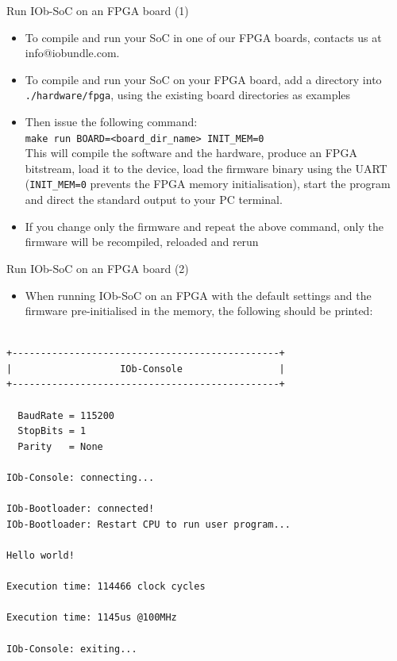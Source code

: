 \documentclass [xcolor=svgnames, t] {beamer}
\begin{document}
\begin{frame}{Run IOb-SoC on an FPGA board (1)}
\begin{itemize}
\item To compile and run your SoC in one of our FPGA boards, contacts us at info@iobundle.com.
\item To compile and run your SoC on your FPGA board, add a directory into {\tt ./hardware/fpga},
  using the existing board directories as examples
\item Then issue the following command:\\
  {\tt make run BOARD=<board\_dir\_name> INIT\_MEM=0}\\
  This will compile the software and the hardware, produce an FPGA bitstream,
  load it to the device, load the firmware binary using the UART ({\tt INIT\_MEM=0} prevents the FPGA memory initialisation), start the
  program and direct the standard output to your PC terminal.
\item If you change only the firmware and repeat the above command, only the
  firmware will be recompiled, reloaded and rerun
\end{itemize}
\end{frame}


\begin{frame}[fragile]{Run IOb-SoC on an FPGA board (2)}
\begin{itemize}
\item When running IOb-SoC on an FPGA with the default settings and the firmware
  pre-initialised in the memory, the following should be printed:
\end{itemize}

\begin{tiny}
  \begin{lstlisting}

+-----------------------------------------------+
|                   IOb-Console                 |
+-----------------------------------------------+

  BaudRate = 115200 
  StopBits = 1 
  Parity   = None

IOb-Console: connecting...

IOb-Bootloader: connected!
IOb-Bootloader: Restart CPU to run user program...

Hello world!

Execution time: 114466 clock cycles

Execution time: 1145us @100MHz

IOb-Console: exiting...

  \end{lstlisting}
\end{tiny}
\end{frame}
\end{document}
